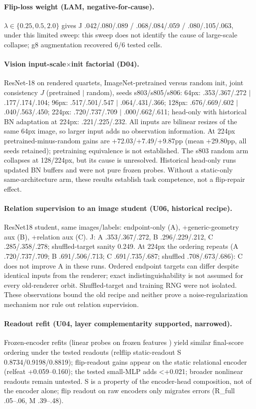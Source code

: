 \paragraph{Flip-loss weight (LAM, negative-for-cause).} $\lambda\in\{0.25,0.5,2.0\}$ gives J .042/.080/.089 / .068/.084/.059 / .080/.105/.063, under this limited sweep: this sweep does not identify the cause of large-scale collapse; g8 augmentation recovered 6/6 tested cells.
\paragraph{Vision input-scale$\times$init factorial (D04).} ResNet-18 \citep{he2016deep} on rendered quartets, ImageNet-pretrained \citep{deng2009imagenet} versus random init, joint consistency $J$ (pretrained $|$ random), seeds s803/s805/s806: 64px: .353/.367/.272 $|$ .177/.174/.104; 96px: .517/.501/.547 $|$ .064/.431/.366; 128px: .676/.669/.602 $|$ .040/.563/.450; 224px: .720/.737/.709 $|$ .000/.662/.611; head-only with historical BN adaptation at 224px: .221/.225/.232. All inputs are bilinear resizes of the same 64px image, so larger input adds no observation information. At 224px pretrained-minus-random gains are +72.03/+7.49/+9.87pp (mean +29.80pp, all seeds retained); pretraining equivalence is not established. The s803 random arm collapses at 128/224px, but its cause is unresolved. Historical head-only runs updated BN buffers and were not pure frozen probes. Without a static-only same-architecture arm, these results establish task competence, not a flip-repair effect.
\paragraph{Relation supervision to an image student (U06, historical recipe).} ResNet18 student, same images/labels: endpoint-only (A), +generic-geometry aux (B), +relation aux (C). J: A .353/.367/.272, B .296/.229/.212, C .285/.358/.278; shuffled-target sanity 0.249. At 224px the ordering repeats (A .720/.737/.709; B .691/.506/.713; C .691/.735/.687; shuffled .708/.673/.686): C does not improve A in these runs. Ordered endpoint targets can differ despite identical inputs from the renderer; exact indistinguishability is not assumed for every old-renderer orbit. Shuffled-target and training RNG were not isolated. These observations bound the old recipe and neither prove a noise-regularization mechanism nor rule out relation supervision.
\paragraph{Readout refit (U04, layer complementarity supported, narrowed).} Frozen-encoder refits (linear probes on frozen features \citep{kumar2022finetuning}) yield similar final-score ordering under the tested readouts (relflip static-readout S 0.8734/0.9198/0.8819); flip-readout gains appear on the static relational encoder (relfeat +0.059--0.160); the tested small-MLP adds <+0.021; broader nonlinear readouts remain untested. S is a property of the encoder-head composition, not of the encoder alone; flip readout on raw encoders only migrates errors (R\_full .05--.06, M .39--.48).
